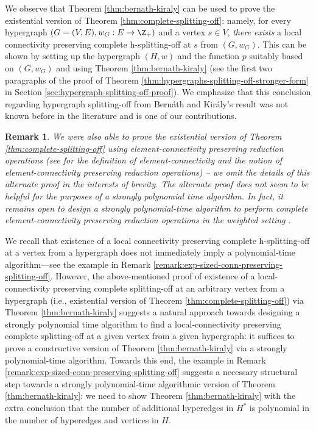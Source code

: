 \documentclass{article}
\newtheorem{remark}{Remark}[section]
\begin{document}
We observe that Theorem \ref{thm:bernath-kiraly} can be used to prove the existential version of Theorem \ref{thm:complete-splitting-off}: namely, for every hypergraph $(G=(V, E), w_G: E\rightarrow \Z_+)$ and a vertex $s\in V$, \emph{there exists} a local connectivity preserving complete h-splitting-off at $s$ from $(G,w_G)$. This can be shown by setting up the hypergraph $(H,w)$ and the function $p$ suitably based on $(G,w_G)$ and using Theorem \ref{thm:bernath-kiraly} (see the first two paragraphs of the proof of Theorem \ref{thm:hypergraphs-splitting-off-stronger-form} in Section \ref{sec:hypergraph-splitting-off-proof}). 
We emphasize that this conclusion regarding hypergraph splitting-off from Bern\'{a}th and Kir\'{a}ly's result was not known before in the literature and is one of our contributions. 
\begin{remark}
    We were also able to prove the existential version of Theorem \ref{thm:complete-splitting-off} using \emph{element-connectivity preserving reduction operations} \cite{BCCKM-private} (see \cite{CK14} for the definition of element-connectivity and the notion of element-connectivity preserving reduction operations) -- we omit the details of this alternate proof in the interests of brevity. The alternate proof does not seem to be helpful for the purposes of a strongly polynomial time algorithm. In fact, it remains open to design a strongly polynomial-time algorithm to perform \emph{complete} element-connectivity preserving reduction operations in the weighted setting \cite{CK14}. 
\end{remark}

We recall that existence of a local connectivity preserving complete h-splitting-off at a vertex from a hypergraph does not immediately imply a polynomial-time algorithm---see the example in Remark \ref{remark:exp-sized-conn-preserving-splitting-off}. 
However, the above-mentioned proof of 
existence of a local-connectivity preserving complete splitting-off at an arbitrary vertex from a hypergraph (i.e., existential version of Theorem \ref{thm:complete-splitting-off}) 
via Theorem \ref{thm:bernath-kiraly} suggests a natural approach towards designing a strongly polynomial time algorithm to find a local-connectivity preserving complete splitting-off at a given vertex from a given hypergraph: it suffices to prove a constructive version of Theorem \ref{thm:bernath-kiraly} via a strongly polynomial-time algorithm. Towards this end, the example in Remark \ref{remark:exp-sized-conn-preserving-splitting-off} suggests a necessary structural step towards a strongly polynomial-time algorithmic version of Theorem \ref{thm:bernath-kiraly}: we need to show Theorem \ref{thm:bernath-kiraly} with the extra conclusion that the number of additional hyperedges in $H^*$ is polynomial in the number of hyperedges and vertices in $H$. 
\end{document}

